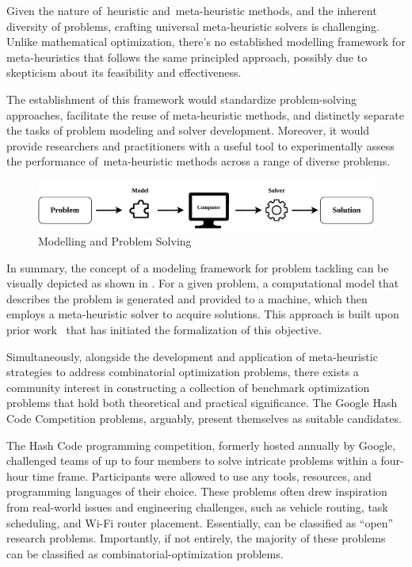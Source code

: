 Given the nature of~\acrlong{heuristic} and~\acrlong{meta-heuristic} methods, and the inherent
diversity of problems, crafting universal meta-heuristic solvers is challenging.
Unlike mathematical optimization, there's no established modelling framework for
meta-heuristics that follows the same principled approach, possibly due to
skepticism about its feasibility and effectiveness.

The establishment of this framework would standardize problem-solving
approaches, facilitate the reuse of meta-heuristic methods, and distinctly
separate the tasks of problem modeling and solver development. Moreover, it
would provide researchers and practitioners with a useful tool to experimentally
assess the performance of~\acrlong{meta-heuristic} methods across a range of diverse
problems.

\begin{figure}[h]
  \centering
  \includegraphics[width=\textwidth,keepaspectratio]{../assets/modelling/modelling.pdf}
  \caption{Modelling and Problem Solving}
  \label{fig:problem-solving}
\end{figure}

In summary, the concept of a modeling framework for problem tackling can be
visually depicted as shown in . For a given
problem, a computational model that describes the problem is generated and
provided to a machine, which then employs a meta-heuristic solver to acquire
solutions. This approach is built upon prior
work~\cite{vieira2009uma,outeiro2021application} that has initiated the
formalization of this objective.

Simultaneously, alongside the development and application of meta-heuristic
strategies to address combinatorial optimization problems, there exists a
community interest in constructing a collection of benchmark optimization
problems that hold both theoretical and practical significance. The Google Hash
Code Competition problems, arguably, present themselves as suitable candidates.

The Hash Code programming competition, formerly hosted annually by Google,
challenged teams of up to four members to solve intricate problems within a
four-hour time frame. Participants were allowed to use any tools, resources, and
programming languages of their choice. These problems often drew inspiration
from real-world issues and engineering challenges, such as vehicle routing, task
scheduling, and Wi-Fi router placement. Essentially, can be classified as
``open'' research problems. Importantly, if not entirely, the majority of these
problems can be classified as \acrlong{combinatorial-optimization} problems.

